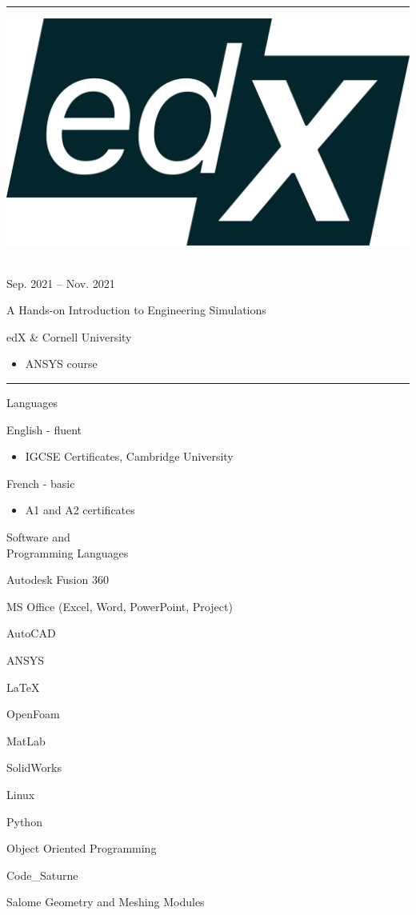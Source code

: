 \documentclass[a4paper,10pt]{article}
\newlength{\cvcolumngapwidth}
\newlength{\cvleftcolumnwidth}
\newlength{\cvrightcolumnwidth}
\newcommand{\cvsectionstyle}[1]{{\normalsize\cvsectionfont\textcolor{cvsectioncolor}{#1}}}
\newcommand{\cvtitlestyle}[1]{{\large\cvtitlefont\textcolor{cvtitlecolor}{#1}}}
\newcommand{\cvdurationstyle}[1]{{\small\cvdurationfont\textcolor{cvdurationcolor}{#1}}}
\newcommand{\cvheadingstyle}[1]{{\normalsize\cvheadingfont\textcolor{cvheadingcolor}{#1}}}
\newlength{\cvafteritemskipamount}
\newlength{\cvaftersectionskipamount}
\newlength{\cvbetweensectionandheadingextraskipamount}
\newlength{\cvaftertitleskipamount}
\newlength{\cvparskip}
\newcommand{\cvsection}[1]{
    \begin{minipage}[t]{\cvleftcolumnwidth}
        \raggedleft\cvsectionstyle{#1}
    \end{minipage}%
    \hspace{\cvcolumngapwidth}%
    \begin{minipage}[t]{\cvrightcolumnwidth}
        \textcolor{cvrulecolor}{\rule{\cvrightcolumnwidth}{0.3mm}}
    \end{minipage}

    \vspace{\cvaftersectionskipamount}
}
\newcommand{\cvitem}[2]{
    \begin{minipage}[t]{\cvleftcolumnwidth}
        \raggedleft #1
    \end{minipage}%
    \hspace{\cvcolumngapwidth}%
    \begin{minipage}[t]{\cvrightcolumnwidth}
        \setlength{\parskip}{\cvparskip} #2
    \end{minipage}

    \vspace{\cvafteritemskipamount}
}
\newcommand{\cvtitle}[1]{
    \cvtitlestyle{#1}

    \vspace{\cvaftertitleskipamount}
    \vspace{-\cvparskip}
}
\begin{document}
\cvsection{COURSES}

\cvitem{
    \begin{minipage}{\textwidth}
        \flushright
        \includegraphics[height=0.15\textwidth]{../logos-photos/Logo_edx.png}   
    \end{minipage}\\
    \vspace{0.1cm}
    \cvdurationstyle{Sep. 2021 -- Nov. 2021}
}{
    \cvtitle{A Hands-on Introduction to Engineering Simulations}
    edX \& Cornell University

    \begin{itemize}
        \item ANSYS course
    \end{itemize}
}
\cvsection{SKILLS}

\vspace{\cvbetweensectionandheadingextraskipamount}

\cvitem{
    \cvheadingstyle{Languages}
}{
    English - fluent 
    \begin{itemize}
        \item IGCSE Certificates, Cambridge University
    \end{itemize}

    French -  basic
    \begin{itemize}
        \item A1 and A2 certificates
    \end{itemize}
}

\cvitem{
    \cvheadingstyle{Software and \\ Programming Languages}
}{
    Autodesk Fusion 360
    
    MS Office (Excel, Word, PowerPoint, Project)

    AutoCAD
    
    ANSYS
    
    LaTeX 
    
    OpenFoam

    MatLab

    SolidWorks

    Linux

    Python

    Object Oriented Programming

    Code\_Saturne

    Salome Geometry and Meshing Modules
}
\end{document}
